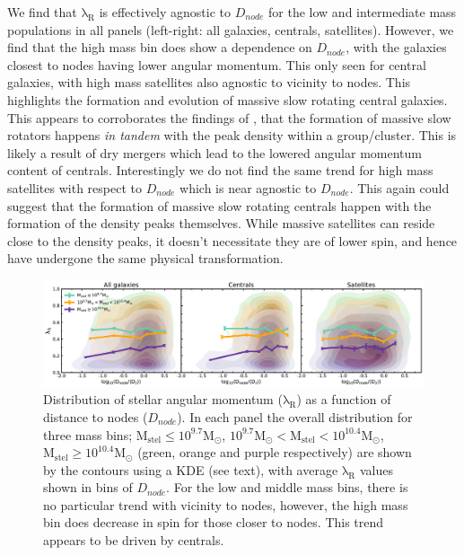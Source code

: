 We find that $\mathrm{\lambda_R}$ is effectively agnostic to $D_{node}$ for the low and intermediate mass populations in all panels (left-right: all galaxies, centrals, satellites). However, we find that the high mass bin does show a dependence on $D_{node}$, with the galaxies closest to nodes having lower angular momentum. This only seen for central galaxies, with high mass satellites also agnostic to vicinity to nodes. This highlights the formation and evolution of massive slow rotating central galaxies. This appears to corroborates the findings of \citet{graham2019}, that the formation of massive slow rotators happens \textit{in tandem} with the peak density within a group/cluster. This is likely a result of dry mergers which lead to the lowered angular momentum content of centrals. Interestingly we do not find the same trend for high mass satellites with respect to $D_{node}$ which is near agnostic to $D_{node}$. This again could suggest that the formation of massive slow rotating centrals happen with the formation of the density peaks themselves. While massive satellites can reside close to the density peaks, it doesn't necessitate they are of lower spin, and hence have undergone the same physical transformation.

\begin{figure}
    \centering\includegraphics[width=\linewidth]{thesis/latex/cw_spin/lambdaR_dnode_mass_split_3sigma.pdf}
    \caption{Distribution of stellar angular momentum ($\mathrm{\lambda_R}$) as a function of distance to nodes ($D_{node}$). In each panel the overall distribution for three mass bins; $\mathrm{M_{stel} \leq 10^{9.7} M_{\odot}}$, $\mathrm{10^{9.7}M_{\odot} < M_{stel} < 10^{10.4}M_{\odot}}$, $\mathrm{M_{stel} \geq 10^{10.4}M_{\odot}}$ (green, orange and purple respectively) are shown by the contours using a KDE (see text), with average $\mathrm{\lambda_R}$ values shown in bins of $D_{node}$. For the low and middle mass bins, there is no particular trend with vicinity to nodes, however, the high mass bin does decrease in spin for those closer to nodes. This trend appears to be driven by centrals.}
\label{fig:lambdaR_dnode}
\end{figure} 

